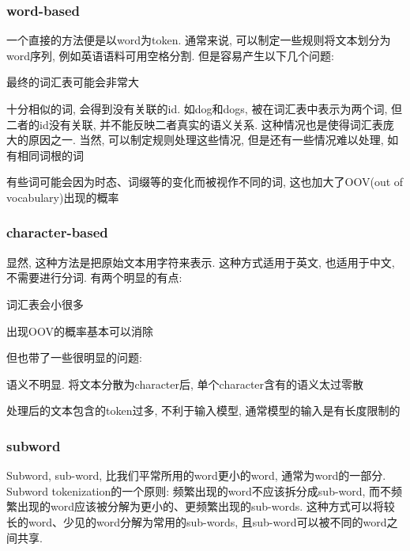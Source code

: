 \subsubsection{word-based}
一个直接的方法便是以word为token. 通常来说, 可以制定一些规则将文本划分为word序列, 例如英语语料可用空格分割. 但是容易产生以下几个问题: 
\begin{myitemize}
	\item 最终的词汇表可能会非常大
	\item 十分相似的词, 会得到没有关联的id. 如dog和dogs, 被在词汇表中表示为两个词, 但二者的id没有关联, 并不能反映二者真实的语义关系. 这种情况也是使得词汇表庞大的原因之一. 当然, 可以制定规则处理这些情况, 但是还有一些情况难以处理, 如有相同词根的词
	\item 有些词可能会因为时态、词缀等的变化而被视作不同的词, 这也加大了OOV(out of vocabulary)出现的概率	
\end{myitemize}

\subsubsection{character-based}
显然, 这种方法是把原始文本用字符来表示. 这种方式适用于英文, 也适用于中文, 不需要进行分词. 有两个明显的有点: 

\begin{myitemize}
	\item 词汇表会小很多
	\item 出现OOV的概率基本可以消除
\end{myitemize}

但也带了一些很明显的问题: 

\begin{myitemize}
	\item 语义不明显. 将文本分散为character后, 单个character含有的语义太过零散
	\item 处理后的文本包含的token过多, 不利于输入模型, 通常模型的输入是有长度限制的
\end{myitemize}

\subsubsection{subword}
Subword, sub-word, 比我们平常所用的word更小的word, 通常为word的一部分. Subword tokenization的一个原则: 频繁出现的word不应该拆分成sub-word, 而不频繁出现的word应该被分解为更小的、更频繁出现的sub-words. 这种方式可以将较长的word、少见的word分解为常用的sub-words, 且sub-word可以被不同的word之间共享. 


